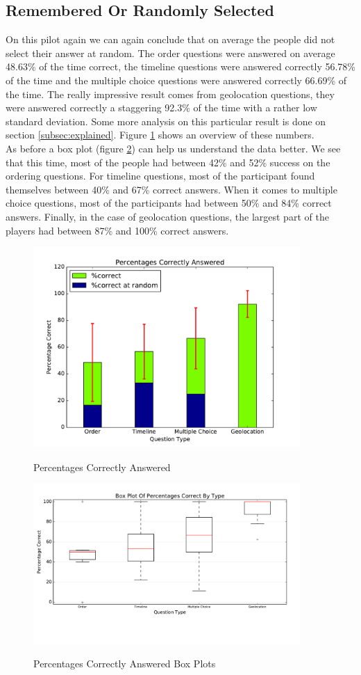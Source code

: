 \subsection{Remembered Or Randomly Selected}\label{sec:p2remem}
On this pilot again we can again conclude that on average the people did not select their answer at random. The order questions were answered on average 48.63\% of the time correct, the timeline questions were answered correctly 56.78\% of the time and the multiple choice questions were answered correctly 66.69\% of the time. The really impressive result comes from geolocation questions, they were answered correctly a staggering 92.3\% of the time with a rather low standard deviation. Some more analysis on this particular result is done on section \ref{subsec:explained}. Figure \ref{fig:p2Correct} shows an overview of these numbers.\\
As before a box plot (figure \ref{fig:p2Boxes}) can help us understand the data better. We see that this time, most of the people had between 42\% and 52\% success on the ordering questions. For timeline questions, most of the participant found themselves between 40\% and 67\% correct answers. When it comes to multiple choice questions, most of the participants had between 50\% and 84\% correct answers. Finally, in the case of geolocation questions, the largest part of the players had between 87\% and 100\% correct answers.

\begin{figure}
\centering
{\includegraphics[width=4in]{images/pilot_2_correct.pdf}}
\caption{Percentages Correctly Answered}
\label{fig:p2Correct}
\end{figure}
\begin{figure}
\centering
{\includegraphics[width=4in]{images/pilot_2_boxplot.pdf}}
\caption{Percentages Correctly Answered Box Plots}
\label{fig:p2Boxes}
\end{figure}

